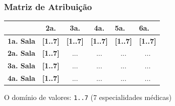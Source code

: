 \documentclass{beamer}
\begin{document}
\begin{frame}
  \frametitle{Matriz de Atribuição}

\begin{table}[]
\begin{tabular}{|c|c|c|c|c|c|}
\hline
{\color[HTML]{00009B} }                                 & {\color[HTML]{CB0000} \textbf{2a.}}                             & {\color[HTML]{CB0000} \textbf{3a.}}        & {\color[HTML]{CB0000} \textbf{4a.}}        & \multicolumn{1}{l|}{{\color[HTML]{CB0000} \textbf{5a.}}}        & \multicolumn{1}{l|}{{\color[HTML]{CB0000} \textbf{6a.}}}        \\ \hline
{\color[HTML]{303498} \textbf{1a. Sala}}                       & {\color[HTML]{009901} \textbf{{[}1..7{]}}}                      & {\color[HTML]{009901} \textbf{{[}1..7{]}}} & {\color[HTML]{009901} \textbf{{[}1..7{]}}} & \multicolumn{1}{l|}{{\color[HTML]{009901} \textbf{{[}1..7{]}}}} & \multicolumn{1}{l|}{{\color[HTML]{009901} \textbf{{[}1..7{]}}}} \\ \hline
{\color[HTML]{303498} \textbf{2a. Sala}}                       & {\color[HTML]{009901} \textbf{{[}1..7{]}}}                      & ...                                        & ...                                        & ...                                                             & ...                                                             \\ \hline
{\color[HTML]{303498} \textbf{3a. Sala}}                       & {\color[HTML]{009901} \textbf{{[}1..7{]}}}                      & ...                                        & ...                                        & ...                                                             & ...                                                             \\ \hline
\multicolumn{1}{|l|}{{\color[HTML]{303498} \textbf{4a. Sala}}} & \multicolumn{1}{l|}{{\color[HTML]{009901} \textbf{{[}1..7{]}}}} & ...                                        & ...                                        & ...                                                             & ...                                                             \\ \hline
\end{tabular}
\end{table}

O domínio de valores: \texttt{1..7} (7 especialidades médicas)

\end{frame}
\end{document}
